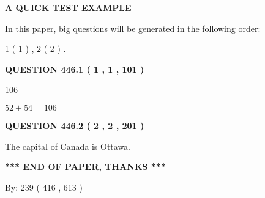 \documentclass[12pt]{article}
\begin{document}
   
\vspace{0.2in}
   
   
   
   
   
   
 \vspace{0.2in}
{\LARGE {\textbf{ A QUICK TEST EXAMPLE}}}
   
   
   
\vspace{0.2in}
   
In this paper, big questions will be generated in the following order: 
   
   
   1 ( 1 )
 ,
   2 ( 2 )
 .
  
\vspace{0.2in}
  
{\textbf{\Large{QUESTION
446.1 
 ( 1 , 1 , 101 )
}}}
  
  
 
 
\noindent{}

106
 
 
 
 
\noindent{}

$ %
52 +  %
54=   %
106$
 
 
  
\vspace{0.2in}
  
{\textbf{\Large{QUESTION
446.2 
 ( 2 , 2 , 201 )
}}}
  
  
 
 
\noindent{}
 
 
The capital of Canada is Ottawa.
 
 
 
 
   
   
 \vspace{0.2in}
 
   
   
   
   
\vspace{1.0in} 
{\textbf{\large{ *** END OF PAPER, THANKS *** }}} 
   
   
\hspace{1.0in} By: 
 239 ( 416 ,  613 )
   
   
   
\end{document}
